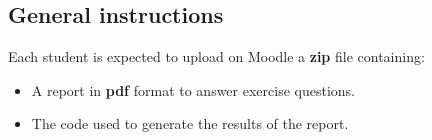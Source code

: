 \subsection*{General instructions}

Each student is expected to upload on Moodle a \textbf{zip} file containing: 

\begin{itemize}
    \item A report in \textbf{pdf} format to answer exercise questions.
    \item The code used to generate the results of the report. 
\end{itemize}

